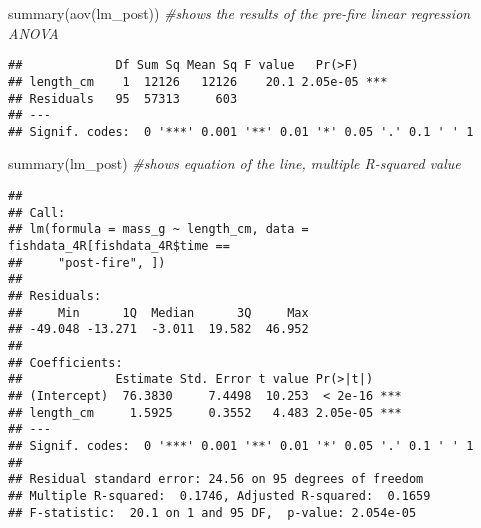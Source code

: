 \documentclass[
]{book}
\newenvironment{Shaded}{\begin{snugshade}}{\end{snugshade}}
\newcommand{\CommentTok}[1]{\textcolor[rgb]{0.56,0.35,0.01}{\textit{#1}}}
\newcommand{\FunctionTok}[1]{\textcolor[rgb]{0.00,0.00,0.00}{#1}}
\newcommand{\NormalTok}[1]{#1}
\begin{document}
\begin{Shaded}
\begin{Highlighting}[]
\FunctionTok{summary}\NormalTok{(}\FunctionTok{aov}\NormalTok{(lm\_post)) }\CommentTok{\#shows the results of the pre{-}fire linear regression ANOVA}
\end{Highlighting}
\end{Shaded}

\begin{verbatim}
##             Df Sum Sq Mean Sq F value   Pr(>F)    
## length_cm    1  12126   12126    20.1 2.05e-05 ***
## Residuals   95  57313     603                     
## ---
## Signif. codes:  0 '***' 0.001 '**' 0.01 '*' 0.05 '.' 0.1 ' ' 1
\end{verbatim}

\begin{Shaded}
\begin{Highlighting}[]
\FunctionTok{summary}\NormalTok{(lm\_post) }\CommentTok{\#shows equation of the line, multiple R{-}squared value}
\end{Highlighting}
\end{Shaded}

\begin{verbatim}
## 
## Call:
## lm(formula = mass_g ~ length_cm, data = fishdata_4R[fishdata_4R$time == 
##     "post-fire", ])
## 
## Residuals:
##     Min      1Q  Median      3Q     Max 
## -49.048 -13.271  -3.011  19.582  46.952 
## 
## Coefficients:
##             Estimate Std. Error t value Pr(>|t|)    
## (Intercept)  76.3830     7.4498  10.253  < 2e-16 ***
## length_cm     1.5925     0.3552   4.483 2.05e-05 ***
## ---
## Signif. codes:  0 '***' 0.001 '**' 0.01 '*' 0.05 '.' 0.1 ' ' 1
## 
## Residual standard error: 24.56 on 95 degrees of freedom
## Multiple R-squared:  0.1746, Adjusted R-squared:  0.1659 
## F-statistic:  20.1 on 1 and 95 DF,  p-value: 2.054e-05
\end{verbatim}
\end{document}
